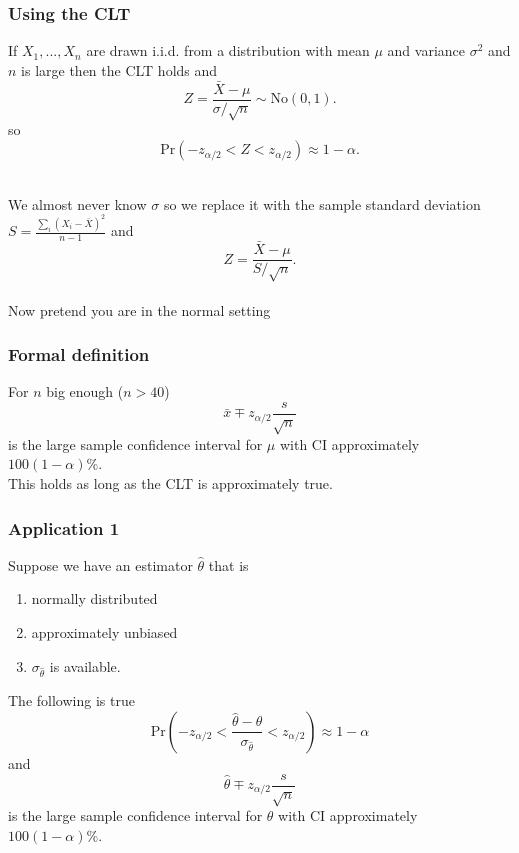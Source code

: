\begin{frame}[fragile]\frametitle{Using the CLT}

{\tiny
If $X_1,...,X_n$ are drawn i.i.d. from a distribution with mean $\mu$
and variance $\sigma^2$ and $n$ is large then the CLT holds and
$$Z = \frac{\bar{X}-\mu}{\sigma / \sqrt{n}} \sim \mbox{No}(0,1).$$ 
so
$$\mbox{Pr}\left(-z_{\alpha/2} < Z < z_{\alpha/2}\right)  \approx
1-\alpha.$$  \\ 

\vspace{.1in}

We almost never know $\sigma$ so we replace it with the sample
standard deviation $S = \frac{\sum_i(X_i -\bar{X})^2}{n-1}$
and 
$$Z = \frac{\bar{X}-\mu}{S / \sqrt{n}}.$$ \\ 

\vspace{.1in}
Now pretend you are in the normal setting

}
\end{frame}


\begin{frame}[fragile]\frametitle{Formal definition}

\begin{defn}
For $n$ big enough ($n>40$)
$$\bar{x} \mp z_{\alpha/2} \frac{s}{\sqrt{n}}$$
is the large sample confidence interval for $\mu$ with
CI approximately $100(1-\alpha)\%$. \\ 

This holds as long as the CLT is approximately true.
\end{defn}

\end{frame}


\begin{frame}[fragile]\frametitle{Application 1}

{\tiny
Suppose we have an estimator $\hat \theta$ that
is
\begin{enumerate}
\item normally distributed
\item approximately unbiased
\item $\sigma_{\hat \theta}$ is available. 
\end{enumerate}

The following is true
$$\mbox{Pr}\left(-z_{\alpha/2} < \frac{\hat \theta -
    \theta}{\sigma_{\hat \theta}} < z_{\alpha/2}\right)  \approx
1-\alpha$$  
and
$$\hat{\theta} \mp z_{\alpha/2} \frac{s}{\sqrt{n}}$$
is the large sample confidence interval for $\theta$ with
CI approximately $100(1-\alpha)\%$. 


}
\end{frame}


